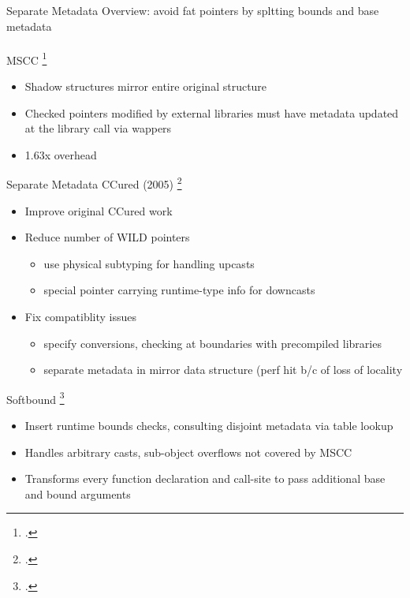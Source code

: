 \documentclass[aspectratio=169]{beamer}
\begin{document}

\begin{frame}[fragile]{Separate Metadata}
Overview: avoid fat pointers by spltting bounds and base metadata
\\
\\
MSCC \footcite{xu_efficient_2004}
    \begin{itemize}
        \item Shadow structures mirror entire original structure
        \item Checked pointers modified by external libraries must have metadata updated at the library call via wappers
        \item 1.63x overhead
    \end{itemize}
\end{frame}

\begin{frame}{Separate Metadata}
CCured (2005) \footcite{necula_ccured:_2005}
    \begin{itemize}
        \item Improve original CCured work
        \item Reduce number of WILD pointers
            \begin{itemize}
                \item use physical subtyping for handling upcasts
                \item special pointer carrying runtime-type info for downcasts
            \end{itemize}
        \item Fix compatiblity issues
            \begin{itemize}
                \item specify conversions, checking at boundaries with precompiled libraries
                \item separate metadata in mirror data structure (perf hit b/c of loss of locality
            \end{itemize}
    \end{itemize}
Softbound \footcite{nagarakatte_softbound:_2009}
    \begin{itemize}
        \item Insert runtime bounds checks, consulting disjoint metadata via table lookup
        \item Handles arbitrary casts, sub-object overflows not covered by MSCC
        \item Transforms every function declaration and call-site to pass additional base and bound arguments %
    \end{itemize}
\end{frame}
\end{document}
